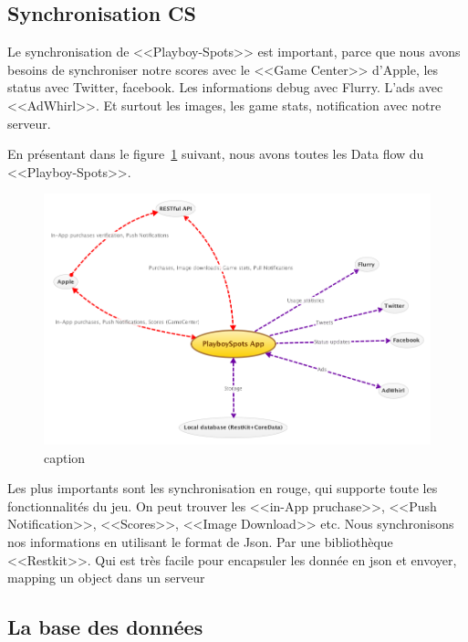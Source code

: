 \subsection{Synchronisation CS} %

Le synchronisation de <<Playboy-Spots>> est important, parce que nous avons besoins de synchroniser notre scores avec le <<Game Center>> d'Apple, les status avec Twitter, facebook. Les informations debug avec Flurry. L'ads avec <<AdWhirl>>. Et surtout les images, les game stats, notification avec notre serveur.

En présentant dans le figure~\ref{fig:XMinds_DataFlow} suivant, nous avons toutes les Data flow du <<Playboy-Spots>>.

\begin{figure}[htbp]
	\centering
		\includegraphics[width=7in]{XMinds/DataFlow.png}
	\caption{caption}
	\label{fig:XMinds_DataFlow}
\end{figure}

Les plus importants sont les synchronisation en rouge, qui supporte toute les fonctionnalités du jeu. On peut trouver les <<in-App pruchase>>, <<Push Notification>>, <<Scores>>, <<Image Download>> etc.
Nous synchronisons nos informations en utilisant le format de Json. Par une bibliothèque <<Restkit>>. Qui est très facile pour encapsuler les donnée en json et envoyer, mapping un object dans un serveur  


\subsection{La base des données} %

